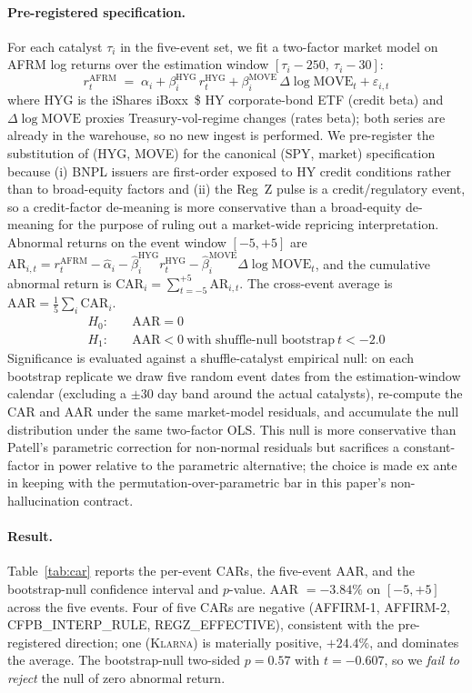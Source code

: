 \documentclass[11pt,letterpaper]{article}
\begin{document}
\paragraph{Pre-registered specification.}
For each catalyst $\tau_i$ in the five-event set, we fit a two-factor
market model on AFRM log returns over the estimation window
$[\tau_i{-}250,\ \tau_i{-}30]$:
\[
r^{\mathrm{AFRM}}_t \;=\; \alpha_i + \beta_i^{\mathrm{HYG}}\,r^{\mathrm{HYG}}_t
  + \beta_i^{\mathrm{MOVE}}\,\Delta\log\mathrm{MOVE}_t + \varepsilon_{i,t}
\]
where HYG is the iShares iBoxx~\$ HY corporate-bond ETF (credit
beta) and $\Delta\log\mathrm{MOVE}$ proxies Treasury-vol-regime
changes (rates beta); both series are already in the warehouse, so
no new ingest is performed. We pre-register the substitution of
(HYG, MOVE) for the canonical (SPY, market) specification because
(i) BNPL issuers are first-order exposed to HY credit conditions
rather than to broad-equity factors and (ii) the Reg~Z pulse is a
credit/regulatory event, so a credit-factor de-meaning is more
conservative than a broad-equity de-meaning for the purpose of
ruling out a market-wide repricing interpretation. Abnormal returns
on the event window $[-5,+5]$ are
$\mathrm{AR}_{i,t} = r^{\mathrm{AFRM}}_t - \hat{\alpha}_i
  - \hat{\beta}_i^{\mathrm{HYG}} r^{\mathrm{HYG}}_t
  - \hat{\beta}_i^{\mathrm{MOVE}} \Delta\log\mathrm{MOVE}_t$,
and the cumulative abnormal return is
$\mathrm{CAR}_i = \sum_{t=-5}^{+5}\mathrm{AR}_{i,t}$. The cross-event
average is $\mathrm{AAR} = \tfrac{1}{5}\sum_i \mathrm{CAR}_i$.
\begin{align*}
H_{0}:\quad & \mathrm{AAR} = 0 \\
H_{1}:\quad & \mathrm{AAR} < 0 \ \text{with shuffle-null bootstrap}\ t < -2.0
\end{align*}
Significance is evaluated against a shuffle-catalyst empirical null:
on each bootstrap replicate we draw five random event dates from the
estimation-window calendar (excluding a $\pm30$ day band around the
actual catalysts), re-compute the CAR and AAR under the same
market-model residuals, and accumulate the null distribution under
the same two-factor OLS. This null is more conservative than
Patell's parametric correction for non-normal residuals but
sacrifices a constant-factor in power relative to the parametric
alternative; the choice is made ex ante in keeping with the
permutation-over-parametric bar in this paper's non-hallucination
contract.

\paragraph{Result.}
Table~\ref{tab:car} reports the per-event CARs, the five-event AAR,
and the bootstrap-null confidence interval and $p$-value. AAR $=
-3.84\%$ on $[-5,+5]$ across the five events. Four of five CARs are
negative (\textsc{AFFIRM-1}, \textsc{AFFIRM-2},
\textsc{CFPB\_INTERP\_RULE}, \textsc{REGZ\_EFFECTIVE}), consistent
with the pre-registered direction; one (\textsc{Klarna}) is
materially positive, $+24.4\%$, and dominates the average. The
bootstrap-null two-sided $p = 0.57$ with $t = -0.607$, so we
\emph{fail to reject} the null of zero abnormal return.
\end{document}
